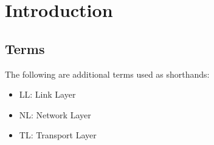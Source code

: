 \section{Introduction}



\subsection{Terms}
The following are additional terms used as shorthands:
\begin{itemize}
\item LL: Link Layer
\item NL: Network Layer
\item TL: Transport Layer
\end{itemize}



